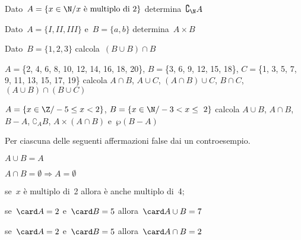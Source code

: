 \begin{multicols}{2}
 
\begin{esercizio}
\label{ese:7.58}
Dato~\(A=\{x\in\N/ x\text{ è multiplo di~2}\}\) 
determina~\(\complement_{\N}A\)
\end{esercizio}


\begin{esercizio}
\label{ese:7.59}
Dato~\(A=\{I, II, III\}\) e~\(B=\{a,b\}\) determina~\(A\times B\)
\end{esercizio}

\begin{esercizio}
\label{ese:7.60}
Dato~\(B=\{1,2,3\}\) calcola~\((B\cup B)\cap B\)
\end{esercizio}

\begin{esercizio}
\label{ese:7.61}
\(A=\)\{2, 4, 6, 8, 10, 12, 14, 16, 18, 20\}, \(B=\)\{3, 6, 9, 12, 15, 18\},
\(C=\)\{1, 3, 5, 7, 9, 11, 13, 15, 17, 19\} calcola
\(A\cap B\), \(A\cup C\), \((A\cap B)\cup C\), \(B\cap C\), \((A\cup 
B)\cap(B\cup C)\)
\end{esercizio}

\begin{esercizio}
\label{ese:7.62}
\(A=\{x\in\Z/-5\le x<2\}\), \(B=\{x\in\N/-3<x\le~2\}\) calcola
\(A\cup B\), \(A\cap B\), \(B-A\), \(\complement_{A}B\), \(A\times(A\cap B)\) 
e~\(\wp 
(B-A)\)
\end{esercizio}

\begin{esercizio}
\label{ese:7.63}
Per ciascuna delle seguenti affermazioni false dai un controesempio.
\vspace{-6pt}

\begin{enumeratea}
 \item \(A\cup B=A\)
\item \(A\cap B=\emptyset \Rightarrow A=\emptyset \)
\item se~\(x\) è multiplo di~2 allora è anche multiplo di~4;
\item se~\(\card A =2\) e~\(\card B = 5\) allora~\(\card A\cup B=7\)
\item se~\(\card A =2\) e~\(\card B = 5\) allora~\(\card A\cap B=2\)
\end{enumeratea}
\end{esercizio}


\end{multicols}
